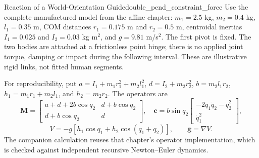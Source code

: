 \begin{example}{Reaction of a World-Orientation Guide}{double_pend_constraint_force}
Use the complete manufactured model from the affine chapter: $m_1=2.5$ kg, $m_2=0.4$ kg, $l_1=0.35$ m, COM distances $r_1=0.175$ m and $r_2=0.5$ m, centroidal inertias $I_1=0.025$ and $I_2=0.03$ kg m$^2$, and $g=9.81$ m/s$^2$. The first pivot is fixed. The two bodies are attached at a frictionless point hinge; there is no applied joint torque, damping or impact during the following interval. These are illustrative rigid links, not fitted human segments.

For reproducibility, put $a=I_1+m_1r_1^2+m_2l_1^2$, $d=I_2+m_2r_2^2$, $b=m_2l_1r_2$, $h_1=m_1r_1+m_2l_1$, and $h_2=m_2r_2$. The operators are
\[
\bm M=\begin{bmatrix}a+d+2b\cos q_2&d+b\cos q_2\\d+b\cos q_2&d\end{bmatrix},
\quad
\bm c=b\sin q_2\begin{bmatrix}-2\dot q_1\dot q_2-\dot q_2^2\\\dot q_1^2\end{bmatrix},
\]
\[
V=-g[h_1\cos q_1+h_2\cos(q_1+q_2)],\qquad \bm g=\nabla V.
\]
The companion calculation reuses that chapter's operator implementation, which is checked against independent recursive Newton--Euler dynamics.


\end{example}
